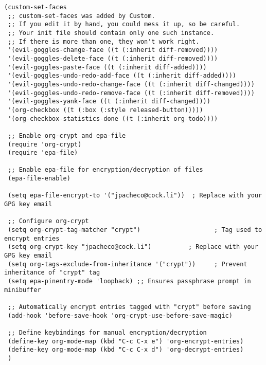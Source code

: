 \documentclass[11pt]{article}
\begin{document}
\begin{verbatim}
(custom-set-faces
 ;; custom-set-faces was added by Custom.
 ;; If you edit it by hand, you could mess it up, so be careful.
 ;; Your init file should contain only one such instance.
 ;; If there is more than one, they won't work right.
 '(evil-goggles-change-face ((t (:inherit diff-removed))))
 '(evil-goggles-delete-face ((t (:inherit diff-removed))))
 '(evil-goggles-paste-face ((t (:inherit diff-added))))
 '(evil-goggles-undo-redo-add-face ((t (:inherit diff-added))))
 '(evil-goggles-undo-redo-change-face ((t (:inherit diff-changed))))
 '(evil-goggles-undo-redo-remove-face ((t (:inherit diff-removed))))
 '(evil-goggles-yank-face ((t (:inherit diff-changed))))
 '(org-checkbox ((t (:box (:style released-button)))))
 '(org-checkbox-statistics-done ((t (:inherit org-todo))))

 ;; Enable org-crypt and epa-file
 (require 'org-crypt)
 (require 'epa-file)

 ;; Enable epa-file for encryption/decryption of files
 (epa-file-enable)

 (setq epa-file-encrypt-to '("jpacheco@cock.li"))  ; Replace with your GPG key email

 ;; Configure org-crypt
 (setq org-crypt-tag-matcher "crypt")                    ; Tag used to encrypt entries
 (setq org-crypt-key "jpacheco@cock.li")          ; Replace with your GPG key email
 (setq org-tags-exclude-from-inheritance '("crypt"))     ; Prevent inheritance of "crypt" tag
 (setq epa-pinentry-mode 'loopback) ;; Ensures passphrase prompt in minibuffer

 ;; Automatically encrypt entries tagged with "crypt" before saving
 (add-hook 'before-save-hook 'org-crypt-use-before-save-magic)

 ;; Define keybindings for manual encryption/decryption
 (define-key org-mode-map (kbd "C-c C-x e") 'org-encrypt-entries)
 (define-key org-mode-map (kbd "C-c C-x d") 'org-decrypt-entries)
 )
\end{verbatim}
\end{document}
